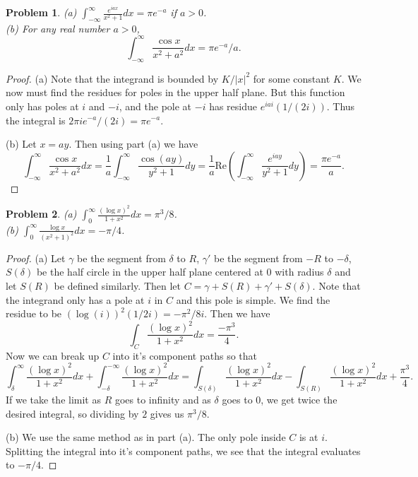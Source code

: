 \documentclass{article}
\newtheorem{problem}{Problem}
\begin{document}
\begin{problem}
(a) $\int_{-\infty}^{\infty} \frac{e^{iax}}{x^2+1}dx = \pi e^{-a}$ if $a > 0$.\\
(b) For any real number $a > 0$,
\[
\int_{-\infty}^{\infty} \frac{\cos x}{x^2 + a^2}dx = \pi e^{-a}/a.
\]
\end{problem}
\begin{proof}
(a) Note that the integrand is bounded by $K/|x|^2$ for some constant $K$. We now must find the residues for poles in the upper half plane. But this function only has poles at $i$ and $-i$, and the pole at $-i$ has residue $e^{iai}(1/(2i))$. Thus the integral is $2 \pi i e^{-a}/(2i) = \pi e^{-a}$.

(b) Let $x = ay$. Then using part (a) we have
\[
\int_{-\infty}^{\infty} \frac{\cos x}{x^2 + a^2}dx = \frac{1}{a} \int_{-\infty}^{\infty} \frac{\cos(ay)}{y^2+1}dy = \frac{1}{a} \text{Re} \left ( \int_{-\infty}^{\infty} \frac{e^{iay}}{y^2+1}dy \right ) = \frac{\pi e^{-a}}{a}.
\]
\end{proof}

\begin{problem}
(a) $\int_0^{\infty} \frac{(\log x)^2}{1+x^2}dx = \pi^3/8$.\\
(b) $\int_0^{\infty} \frac{\log x}{(x^2+1)^2} dx = -\pi/4$.
\end{problem}
\begin{proof}
(a) Let $\gamma$ be the segment from $\delta$ to $R$, $\gamma'$ be the segment from $-R$ to $-\delta$, $S(\delta)$ be the half circle in the upper half plane centered at $0$ with radius $\delta$ and let $S(R)$ be defined similarly. Then let $C = \gamma + S(R) + \gamma' + S(\delta)$. Note that the integrand only has a pole at $i$ in $C$ and this pole is simple. We find the residue to be $(\log(i))^2 (1/2i) = -\pi^2/8i$. Then we have
\[
\int_{C} \frac{(\log x)^2}{1+x^2}dx = \frac{-\pi^3}{4}.
\]
Now we can break up $C$ into it's component paths so that
\[
\int_{\delta}^{\infty} \frac{(\log x)^2}{1+x^2}dx + \int_{-\delta}^{-\infty} \frac{(\log x)^2}{1+x^2}dx = \int_{S(\delta)}\frac{(\log x)^2}{1+x^2}dx - \int_{S(R)} \frac{(\log x)^2}{1+x^2}dx + \frac{\pi^3}{4}.
\]
If we take the limit as $R$ goes to infinity and as $\delta$ goes to $0$, we get twice the desired integral, so dividing by $2$ gives us $\pi^3/8$.

(b) We use the same method as in part (a). The only pole inside $C$ is at $i$. Splitting the integral into it's component paths, we see that the integral evaluates to $-\pi/4$.
\end{proof}
\end{document}
